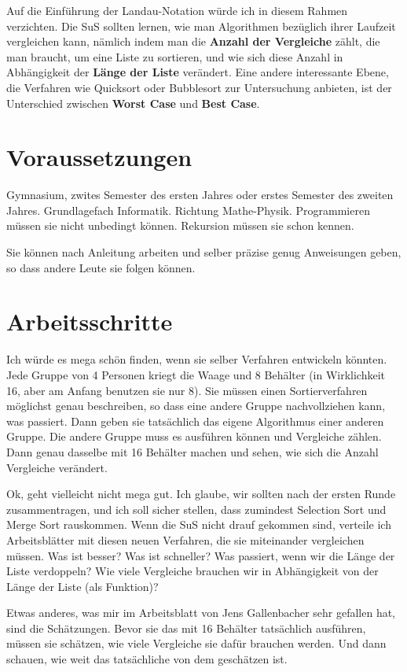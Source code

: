 \documentclass[
	12pt, %
	german, %
]{fphw}
\begin{document}
Auf die Einführung der Landau-Notation würde ich in diesem Rahmen verzichten. Die SuS sollten lernen, wie man Algorithmen bezüglich ihrer Laufzeit vergleichen kann, nämlich indem man die \textbf{Anzahl der Vergleiche} zählt, die man braucht, um eine Liste zu sortieren, und wie sich diese Anzahl in Abhängigkeit der \textbf{Länge der Liste} verändert. Eine andere interessante Ebene, die Verfahren wie Quicksort oder Bubblesort zur Untersuchung anbieten, ist der Unterschied zwischen \textbf{Worst Case}  und \textbf{Best Case}.

\section*{Voraussetzungen}
Gymnasium, zwites Semester des ersten Jahres oder erstes Semester des zweiten Jahres. Grundlagefach Informatik. Richtung Mathe-Physik.
Programmieren müssen sie nicht unbedingt können. Rekursion müssen sie schon kennen.

Sie können nach Anleitung arbeiten und selber präzise genug Anweisungen geben, so dass andere Leute sie folgen können.

\section*{Arbeitsschritte}

Ich würde es mega schön finden, wenn sie selber Verfahren entwickeln könnten.
Jede Gruppe von 4 Personen kriegt die Waage und 8 Behälter (in Wirklichkeit 16, aber am Anfang benutzen sie nur 8). Sie müssen einen Sortierverfahren möglichst genau beschreiben, so dass eine andere Gruppe nachvollziehen kann, was passiert.
Dann geben sie tatsächlich das eigene Algorithmus einer anderen Gruppe. Die andere Gruppe muss es ausführen können und Vergleiche zählen. Dann genau dasselbe mit 16 Behälter machen und sehen, wie sich die Anzahl Vergleiche verändert.

Ok, geht vielleicht nicht mega gut. Ich glaube, wir sollten nach der ersten Runde zusammentragen, und ich soll sicher stellen, dass zumindest Selection Sort und Merge Sort rauskommen. Wenn die SuS nicht drauf gekommen sind, verteile ich Arbeitsblätter mit diesen neuen Verfahren, die sie miteinander vergleichen müssen. Was ist besser? Was ist schneller? Was passiert, wenn wir die Länge der Liste verdoppeln? Wie viele Vergleiche brauchen wir in Abhängigkeit von der Länge der Liste (als Funktion)?

Etwas anderes, was mir im Arbeitsblatt von Jens Gallenbacher sehr gefallen hat, sind die Schätzungen. Bevor sie das mit 16 Behälter tatsächlich ausführen, müssen sie schätzen, wie viele Vergleiche sie dafür brauchen werden. Und dann schauen, wie weit das tatsächliche von dem geschätzen ist.
\end{document}
